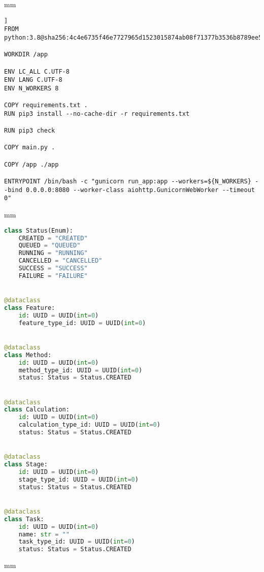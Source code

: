  mm
\begin{lstlisting}[caption=Dockerfile, captionpos=b]]
FROM python:3.8@sha256:4c4e6735f46e7727965d1523015874ab08f71377b3536b8789ee5742fc737059

WORKDIR /app

ENV LC_ALL C.UTF-8
ENV LANG C.UTF-8
ENV N_WORKERS 8

COPY requirements.txt .
RUN pip3 install --no-cache-dir -r requirements.txt

RUN pip3 check

COPY main.py .

COPY /app ./app

ENTRYPOINT /bin/bash -c "gunicorn run_app:app --workers=${N_WORKERS} --bind 0.0.0.0:8080 --worker-class aiohttp.GunicornWebWorker --timeout 0"
\end{lstlisting}

 mm
\begin{lstlisting}[language=Python, caption=domain/model.py, captionpos=b]
class Status(Enum):
    CREATED = "CREATED"
    QUEUED = "QUEUED"
    RUNNING = "RUNNING"
    CANCELLED = "CANCELLED"
    SUCCESS = "SUCCESS"
    FAILURE = "FAILURE"


@dataclass
class Feature:
    id: UUID = UUID(int=0)
    feature_type_id: UUID = UUID(int=0)


@dataclass
class Method:
    id: UUID = UUID(int=0)
    method_type_id: UUID = UUID(int=0)
    status: Status = Status.CREATED


@dataclass
class Calculation:
    id: UUID = UUID(int=0)
    calculation_type_id: UUID = UUID(int=0)
    status: Status = Status.CREATED


@dataclass
class Stage:
    id: UUID = UUID(int=0)
    stage_type_id: UUID = UUID(int=0)
    status: Status = Status.CREATED


@dataclass
class Task:
    id: UUID = UUID(int=0)
    name: str = ""
    task_type_id: UUID = UUID(int=0)
    status: Status = Status.CREATED
\end{lstlisting}
 mm
